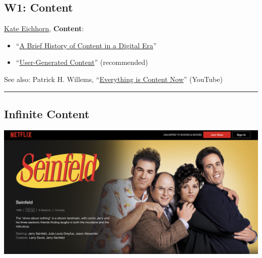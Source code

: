 \documentclass[
  letterpaper,
  DIV=11,
  numbers=noendperiod,
  oneside]{scrartcl}
\author{}
\date{}
\providecommand{\tightlist}{%
  \setlength{\itemsep}{0pt}\setlength{\parskip}{0pt}}\usepackage{longtable,booktabs,array}
\begin{document}
\pagestyle{mystyle}


\subsection{W1: Content}\label{w1-content}

\href{https://emerson.edu/faculty-staff-directory/kate-eichhorn}{Kate
Eichhorn}, \textbf{Content}:

\begin{itemize}
\tightlist
\item
  ``\href{pdf/eichhorn-content-ch1.pdf}{A Brief History of Content in a
  Digital Era}''
\item
  ``\href{pdf/eichhorn-content-ch2.pdf}{User-Generated Content}''
  (recommended)
\end{itemize}


See also: Patrick H. Willems,
``\href{https://youtu.be/hAtbFwzZp6Y}{Everything is Content Now}''
(YouTube)

\begin{center}\rule{0.5\linewidth}{0.5pt}\end{center}

\subsection{Infinite Content}\label{infinite-content}

\href{https://www.netflix.com/title/70153373}{\includegraphics{img/seinfeld-netflix.jpg}}
\end{document}
